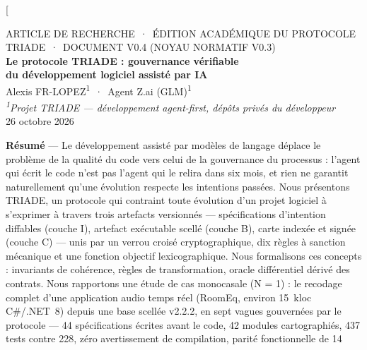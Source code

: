\documentclass[10pt,a4paper,twocolumn]{article}
\theoremstyle{definition}
\theoremstyle{plain}
\begin{document}
\twocolumn[{%
\begin{center}
  {\footnotesize\sffamily\color{grisdoux}\MakeUppercase{Article de recherche
   \,·\, Édition académique du protocole \textsc{Triade} \,·\, Document v0.4
   (noyau normatif v0.3)}}\\[10pt]
  {\LARGE\bfseries Le protocole TRIADE : gouvernance vérifiable\\[3pt]
   du développement logiciel assisté par IA}\\[9pt]
  {\normalsize Alexis FR-LOPEZ\textsuperscript{1}
   \,·\, Agent Z.ai (GLM)\textsuperscript{1}}\\[3pt]
  {\small\itshape\textsuperscript{1}Projet TRIADE — développement agent-first,
   dépôts privés du développeur}\\[8pt]
  {\small 26 octobre 2026}
\end{center}
\vspace{2pt}
\begin{center}
\begin{minipage}{0.88\textwidth}
  \small
  \textbf{Résumé} — Le développement assisté par modèles de langage déplace le
  problème de la qualité du code vers celui de la gouvernance du processus :
  l’agent qui écrit le code n’est pas l’agent qui le relira dans six mois, et
  rien ne garantit naturellement qu’une évolution respecte les intentions
  passées. Nous présentons TRIADE, un protocole qui contraint toute évolution
  d’un projet logiciel à s’exprimer à travers trois artefacts versionnés —
  spécifications d’intention diffables (couche I), artefact exécutable scellé
  (couche B), carte indexée et signée (couche C) — unis par un verrou croisé
  cryptographique, dix règles à sanction mécanique et une fonction objectif
  lexicographique. Nous formalisons ces concepts : invariants de cohérence,
  règles de transformation, oracle différentiel dérivé des contrats. Nous
  rapportons une étude de cas monocasale (N = 1) : le recodage complet d’une
  application audio temps réel (RoomEq, environ 15~kloc C\#/.NET~8) depuis une
  base scellée v2.2.2, en sept vagues gouvernées par le protocole —
  44 spécifications écrites avant le code, 42 modules cartographiés, 437 tests
  contre 228, zéro avertissement de compilation, parité fonctionnelle de 14

\end{minipage}
\end{center}}
\end{document}
